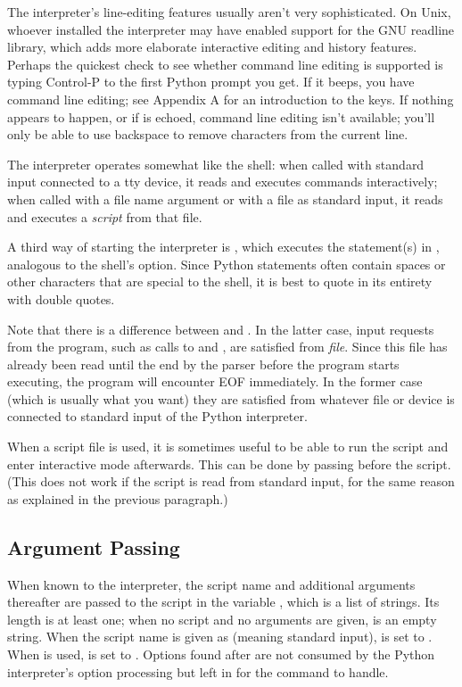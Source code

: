 The interpreter's line-editing features usually aren't very
sophisticated.  On Unix, whoever installed the interpreter may have
enabled support for the GNU readline library, which adds more
elaborate interactive editing and history features. Perhaps the
quickest check to see whether command line editing is supported is
typing Control-P to the first Python prompt you get.  If it beeps, you
have command line editing; see Appendix A for an introduction to the
keys.  If nothing appears to happen, or if  is echoed,
command line editing isn't available; you'll only be able to use
backspace to remove characters from the current line.

The interpreter operates somewhat like the \UNIX{} shell: when called
with standard input connected to a tty device, it reads and executes
commands interactively; when called with a file name argument or with
a file as standard input, it reads and executes a \emph{script} from
that file. 

A third way of starting the interpreter is
, which
executes the statement(s) in , analogous to the shell's
 option.  Since Python statements often contain spaces or other
characters that are special to the shell, it is best to quote
 in its entirety with double quotes.

Note that there is a difference between  and
.  In the latter case, input requests from the
program, such as calls to  and , are
satisfied from \emph{file}.  Since this file has already been read
until the end by the parser before the program starts executing, the
program will encounter EOF immediately.  In the former case (which is
usually what you want) they are satisfied from whatever file or device
is connected to standard input of the Python interpreter.

When a script file is used, it is sometimes useful to be able to run
the script and enter interactive mode afterwards.  This can be done by
passing  before the script.  (This does not work if the script
is read from standard input, for the same reason as explained in the
previous paragraph.)

\subsection{Argument Passing}

When known to the interpreter, the script name and additional
arguments thereafter are passed to the script in the variable
, which is a list of strings.  Its length is at least
one; when no script and no arguments are given,  is
an empty string.  When the script name is given as  (meaning 
standard input),  is set to .  When  is used,  is set to .  Options
found after  are not consumed by the Python
interpreter's option processing but left in  for the
command to handle.

